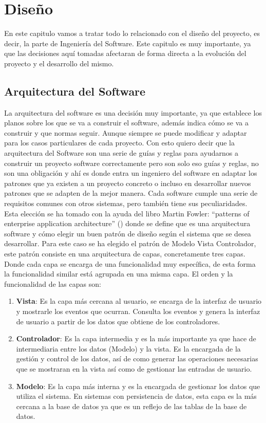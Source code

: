 \chapter{ Diseño}
En este capitulo vamos a tratar todo lo relacionado con el diseño del proyecto, es decir, la parte de Ingeniería del Software. Este capitulo es muy importante, ya que las decisiones aquí tomadas afectaran de forma directa a la evolución del proyecto y el desarrollo del mismo.
 
\section{Arquitectura del Software}
La arquitectura del software es una decisión muy importante, ya que establece los planos sobre los que se va a construir el software, además indica cómo se va a construir y que normas seguir. Aunque siempre se puede modificar y adaptar para los casos particulares de cada proyecto. Con esto quiero decir que la arquitectura del Software son una serie de guías y reglas para ayudarnos a construir un proyecto software correctamente pero son solo eso guías y reglas, no son una obligación y ahí es donde entra un ingeniero del software en adaptar los patrones que ya existen a un proyecto concreto o incluso en desarrollar nuevos patrones que se adapten de la mejor manera. Cada software cumple una serie de requisitos comunes con otros sistemas, pero también tiene sus peculiaridades.\\

Esta elección se ha tomado con la ayuda del libro Martin Fowler: ``patterns of enterprise application architecture'' (\cite{fowlerPatternsEnterpriseApplication2012}) donde se define que es una arquitectura software y cómo elegir un buen patrón de diseño según el sistema que se desea desarrollar. Para este caso se ha elegido el patrón de Modelo Vista Controlador, este patrón consiste en una arquitectura de capas, concretamente tres capas. Donde cada capa se encarga de una funcionalidad muy específica,  
de esta forma la funcionalidad similar está agrupada en una misma capa. El orden y la funcionalidad de las capas son:

\begin{enumerate}
	\item \textbf{Vista}: Es la capa más cercana al usuario, se encarga de la interfaz de usuario y mostrarle los eventos que ocurran. Consulta los eventos y genera la interfaz de usuario a partir de los datos que obtiene de los controladores.
	
	\item \textbf{Controlador}: Es la capa intermedia y es la más importante ya que hace de intermediaria entre los datos (Modelo) y la vista. Es la encargada de la gestión y control de los datos, así de como generar las operaciones necesarias que se mostraran en la vista así como de gestionar las entradas de usuario.
	
	\item \textbf{Modelo}: Es la capa más interna y es la encargada de gestionar los datos que utiliza el sistema. En sistemas con persistencia de datos, esta capa es la más cercana a la base de datos ya que es un reflejo de las tablas de la base de datos.
\end{enumerate}

